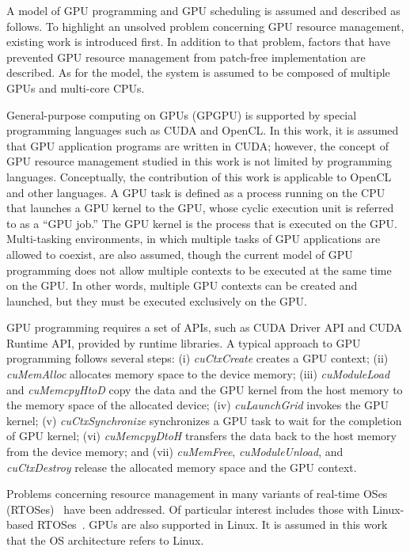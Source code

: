 \label{sec:system_model}
A model of GPU programming and GPU scheduling is assumed and described as follows.
To highlight an unsolved problem concerning GPU resource management, existing work is introduced first.
In addition to that problem, factors that have prevented GPU resource management from patch-free implementation are described.
As for the model, the system is assumed to be composed of multiple GPUs and multi-core CPUs.

General-purpose computing on GPUs (GPGPU) is supported by special programming languages such as CUDA and OpenCL.
In this work, it is assumed that GPU application programs are written in CUDA; however, the concept of GPU resource management studied in this work is not limited by programming languages.
Conceptually, the contribution of this work is applicable to OpenCL and other languages.
A GPU task is defined as a process running on the CPU that launches a GPU kernel to the GPU, whose cyclic execution unit is referred to as a ``GPU job.''
The GPU kernel is the process that is executed on the GPU.
Multi-tasking environments, in which multiple tasks of GPU applications are allowed to coexist, are also assumed, though the current model of GPU programming does not allow multiple contexts to be executed at the same time on the GPU.
In other words, multiple GPU contexts can be created and launched, but they must be executed exclusively on the GPU.

GPU programming requires a set of APIs, such as CUDA Driver API and CUDA Runtime API, provided by runtime libraries.
A typical approach to GPU programming follows several steps: (i) \textit{cuCtxCreate} creates a GPU context; (ii) \textit{cuMemAlloc} allocates memory space to the device memory; (iii) \textit{cuModuleLoad} and \textit{cuMemcpyHtoD} copy the data and the GPU kernel from the host memory to the memory space of the allocated device; (iv) \textit{cuLaunchGrid} invokes the GPU kernel; (v) \textit{cuCtxSynchronize} synchronizes a GPU task to wait for the completion of GPU kernel; (vi) \textit{cuMemcpyDtoH} transfers the data back to the host memory from the device memory; and (vii) \textit{cuMemFree}, \textit{cuModuleUnload}, and \textit{cuCtxDestroy} release the allocated memory space and the GPU context.

Problems concerning resource management in many variants of real-time OSes (RTOSes)~\cite{spring,redline,itron,rk} have been addressed.
Of particular interest includes those with Linux-based RTOSes~\cite{litmus,prk,rtai,yodaiken1999rtlinux,kato2009loadable}.
GPUs are also supported in Linux.
It is assumed in this work that the OS architecture refers to Linux.

